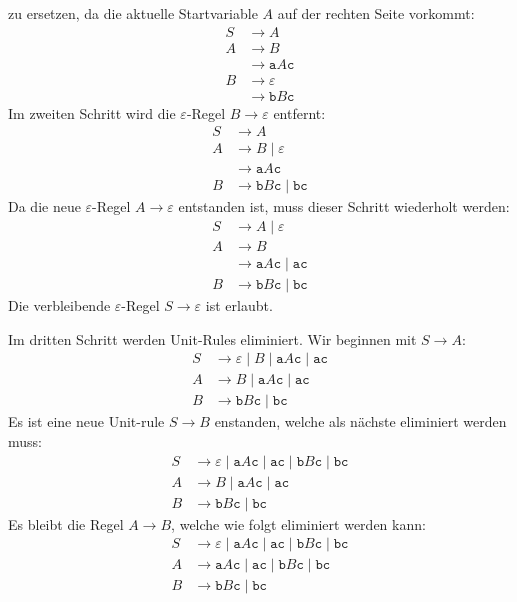 \begin{loesung}
\begin{teilaufgaben}
zu ersetzen, da die aktuelle Startvariable $A$ auf der rechten Seite vorkommt:
\begin{align*}
S&\rightarrow A\\
A&\rightarrow B \\
 &\rightarrow \texttt{a} A \texttt{c} \\
B&\rightarrow \varepsilon \\
 &\rightarrow \texttt{b} B \texttt{c}
\end{align*}
Im zweiten Schritt wird die $\varepsilon$-Regel $B\to\varepsilon$ entfernt:
\begin{align*}
S&\rightarrow A\\
A&\rightarrow B \;|\; \varepsilon\\
 &\rightarrow \texttt{a} A \texttt{c} \\
B&\rightarrow \texttt{b} B \texttt{c} \;|\; \texttt{b} \texttt{c}
\end{align*}
Da die neue $\varepsilon$-Regel $A\to\varepsilon$ entstanden ist, muss
dieser Schritt wiederholt werden:
\begin{align*}
S&\rightarrow A \;|\; \varepsilon\\
A&\rightarrow B \\
 &\rightarrow \texttt{a} A \texttt{c} \;|\; \texttt{ac}\\
B&\rightarrow \texttt{b} B \texttt{c} \;|\; \texttt{b} \texttt{c}
\end{align*}
Die verbleibende $\varepsilon$-Regel $S\to\varepsilon$ ist erlaubt.

Im dritten Schritt werden Unit-Rules eliminiert.
Wir beginnen mit $S\to A$:
\begin{align*}
S&\rightarrow \varepsilon \;|\; B \;|\; \texttt{a}A\texttt{c} \;|\;\texttt{ac}\\
A&\rightarrow B \;|\; \texttt{a} A \texttt{c} \;|\; \texttt{ac}\\
B&\rightarrow \texttt{b} B \texttt{c} \;|\; \texttt{b} \texttt{c}
\end{align*}
Es ist eine neue Unit-rule $S\to B$ enstanden, welche als nächste eliminiert
werden muss:
\begin{align*}
S&\rightarrow \varepsilon \;|\; \texttt{a}A\texttt{c} \;|\;\texttt{ac}
\;|\; \texttt{b} B \texttt{c} \;|\; \texttt{b} \texttt{c}
\\
A&\rightarrow B \;|\; \texttt{a} A \texttt{c} \;|\; \texttt{ac}\\
B&\rightarrow \texttt{b} B \texttt{c} \;|\; \texttt{b} \texttt{c}
\end{align*}
Es bleibt die Regel $A\to B$, welche wie folgt eliminiert werden kann:
\begin{align*}
S&\rightarrow \varepsilon \;|\; \texttt{a}A\texttt{c} \;|\;\texttt{ac}
\;|\; \texttt{b} B \texttt{c} \;|\; \texttt{b} \texttt{c}
\\
A&\rightarrow \texttt{a} A \texttt{c} \;|\; \texttt{ac} \;|\;
 \texttt{b} B \texttt{c} \;|\; \texttt{b} \texttt{c} \\
B&\rightarrow \texttt{b} B \texttt{c} \;|\; \texttt{b} \texttt{c}
\end{align*}


\end{teilaufgaben}
\end{loesung}
